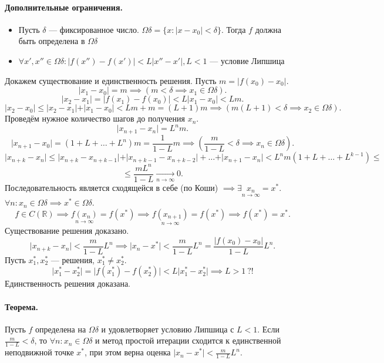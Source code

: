 \paragraph{Дополнительные ограничения.} \begin{itemize}
\item Пусть $\delta$ --- фиксированное число. $\Omega\delta = \{x: \vert x - x_0 \vert < \delta \}$. Тогда $f$ должна быть определена в $\Omega \delta$
\item $\forall x', x'' \in \Omega\delta: \vert f(x'') - f(x') \vert < L\vert x'' - x' \vert, L < 1$ --- условие Липшица
\end{itemize}
Докажем существование и единственность решения.
Пусть $m = \vert f(x_0) - x_0 \vert$.
\[
	\vert x_1 - x_0\vert = m \implies (m < \delta \implies x_1 \in \Omega\delta).
\]
\[
	\vert x_2 - x_1\vert = \vert f(x_1) - f(x_0) \vert < L \vert x_1 - x_0 \vert < Lm.
\]
\[
	\vert x_2 - x_0\vert \leq \vert x_2 - x_1 \vert + \vert x_1 - x_0 \vert < Lm + m = (L + 1)m \implies (m(L+1) < \delta \implies x_2 \in \Omega\delta).
\]
Проведём нужное количество шагов до получения $x_n$.
\[
	\vert x_{n+1} - x_n \vert = L^n m.
\]
\[
	\vert x_{n+1} - x_0\vert = (1+L+\hdots+L^n)m = \frac{1}{1-L}m \implies (\frac{m}{1-L} < \delta \implies x_n \in \Omega \delta).
\]
\[
	\vert x_{n+k}-x_n\vert \leq \vert x_{n+k} - x_{n+k-1}\vert + \vert x_{n+k-1} - x_{n+k-2}\vert + \hdots + \vert x_{n+1} - x_n \vert < L^n m (1+L+\hdots+L^{k-1}) \leq
\]
\[
	\leq \frac{mL^n}{1-L} \underset{n \to \infty}{\longrightarrow} 0.
\]
Последовательность является сходящейся в себе (по Коши) $\implies \exists \underset{n \to \infty}{x_n} = x^*$.
$\forall n: x_n \in \Omega\delta \implies x^* \in \Omega\delta$.
\[
	f \in C(\mathbb{R}) \implies \underset{n\to\infty}{f(x_n)}=f(x^*)\implies\underset{n\to\infty}{f(x_{n+1})}=f(x^*)\implies f(x^*)=x^*.
\]
Существование решения доказано.
\[
	\vert x_{n+k} - x_n \vert < \frac{m}{1-L}L^n\implies \vert x_n - x^*\vert < \frac{m}{1-L}L^n = \frac{\vert f(x_0)-x_0\vert}{1-L}L^n.
\]
Пусть $x_1^*, x_2^*$ --- решения, $x_1^* \neq x_2^*$.
\[
	\vert x_1^* - x_2^* \vert = \vert f(x_1^*) - f(x_2^*)\vert < L\vert x_1^* - x_2^* \vert \implies L > 1 \ ?!
\]
Единственность решения доказана.
\paragraph{Теорема.} Пусть $f$ определена на $\Omega\delta$ и удовлетворяет условию Липшица с $L < 1$. Если $\frac{m}{1-L} < \delta$, то $\forall n: x_n \in \Omega \delta$ и метод простой итерации сходится к единственной неподвижной точке $x^*$, при этом верна оценка $\vert x_n - x^*\vert < \frac {m}{1-L}L^n$.

